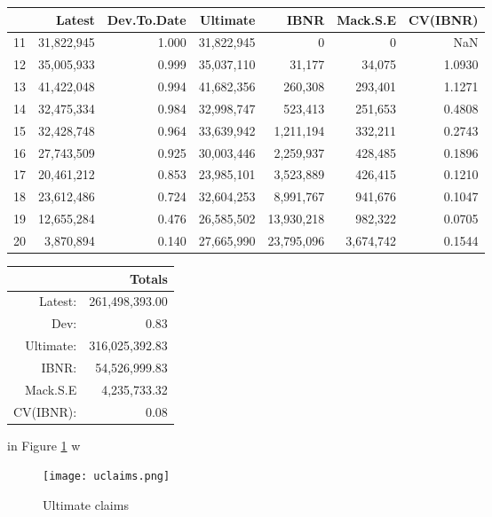 \documentclass[a4paper]{article}
\begin{document}
\begin{table}[ht]
\centering
\begin{tabular}{rrrrrrr}
      & Latest& Dev.To.Date&   Ultimate&       IBNR&  Mack.S.E& CV(IBNR) \\
  \hline
11& 31,822,945&       1.000& 31,822,945&          0&         0&      NaN\\
12 &35,005,933 &      0.999& 35,037,110&     31,177&    34,075&   1.0930\\
13 &41,422,048   &    0.994& 41,682,356&    260,308&   293,401 &  1.1271\\
14& 32,475,334 &      0.984& 32,998,747&    523,413 &  251,653&   0.4808\\
15& 32,428,748   &    0.964& 33,639,942& 1,211,194   &332,211 &  0.2743\\
16& 27,743,509  &     0.925 &30,003,446&  2,259,937 &  428,485&   0.1896\\
17& 20,461,212   &    0.853& 23,985,101&  3,523,889 &  426,415 &  0.1210\\
18 &23,612,486   &    0.724 &32,604,253&  8,991,767 &  941,676&   0.1047\\
19 &12,655,284  &     0.476& 26,585,502& 13,930,218 &  982,322&   0.0705\\
20&  3,870,894  &     0.140& 27,665,990& 23,795,096 &3,674,742&   0.1544\\
   \hline
\end{tabular}
\end{table}

\begin{table}[ht]
\centering
\begin{tabular}{rr}
     
  \hline
&                  Totals\\
\hline
Latest:  & 261,498,393.00\\
Dev:        &        0.83\\
Ultimate: &316,025,392.83\\
IBNR:  &    54,526,999.83\\
Mack.S.E&    4,235,733.32\\
CV(IBNR): &          0.08\\
   \hline
\end{tabular}
\end{table}

 in Figure \ref{fig:ultimate} w

 \begin{figure}[H]
 \center
  \texttt{[image: uclaims.png]}
  \caption{Ultimate claims}
  \label{fig:ultimate}
\end{figure}
\end{document}
